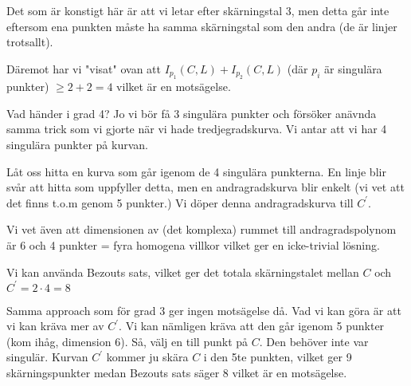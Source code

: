 \noindent Det som är konstigt här är att vi letar efter skärningstal 3, men detta går inte eftersom ena punkten måste ha samma skärningstal som den andra (de är linjer trotsallt). \par
\noindent Däremot har vi "visat" ovan att $I_{p_1}(C,L) + I_{p_2}(C,L)$ (där $p_i$ är singulära punkter) $\geq 2+2=4$ vilket är en motsägelse.
\par\bigskip
\noindent Vad händer i grad 4? Jo vi bör få 3 singulära punkter och försöker anävnda samma trick som vi gjorte när vi hade tredjegradskurva. Vi antar att vi har 4 singulära punkter på kurvan.\par
\noindent Låt oss hitta en kurva som går igenom de 4 singulära punkterna. En linje blir svår att hitta som uppfyller detta, men en andragradskurva blir enkelt (vi vet att det finns t.o.m genom 5 punkter.) Vi döper denna andragradskurva till $C^{\prime}$.\par
\noindent Vi vet även att dimensionen av (det komplexa) rummet till andragradspolynom är 6 och 4 punkter = fyra homogena villkor vilket ger en icke-trivial lösning.\par
\noindent Vi kan använda Bezouts sats, vilket ger det totala skärningstalet mellan $C$ och $C^{\prime} = 2\cdot4=8$\par
\noindent Samma approach som för grad 3 ger ingen motsägelse då. Vad vi kan göra är att vi kan kräva mer av $C^{\prime}$. Vi kan nämligen kräva att den går igenom 5 punkter (kom ihåg, dimension 6). Så, välj en till punkt på $C$. Den behöver inte var singulär. Kurvan $C^{\prime}$ kommer ju skära $C$ i den 5te punkten, vilket ger 9 skärningspunkter medan Bezouts sats säger 8 vilket är en motsägelse.
\par\bigskip
